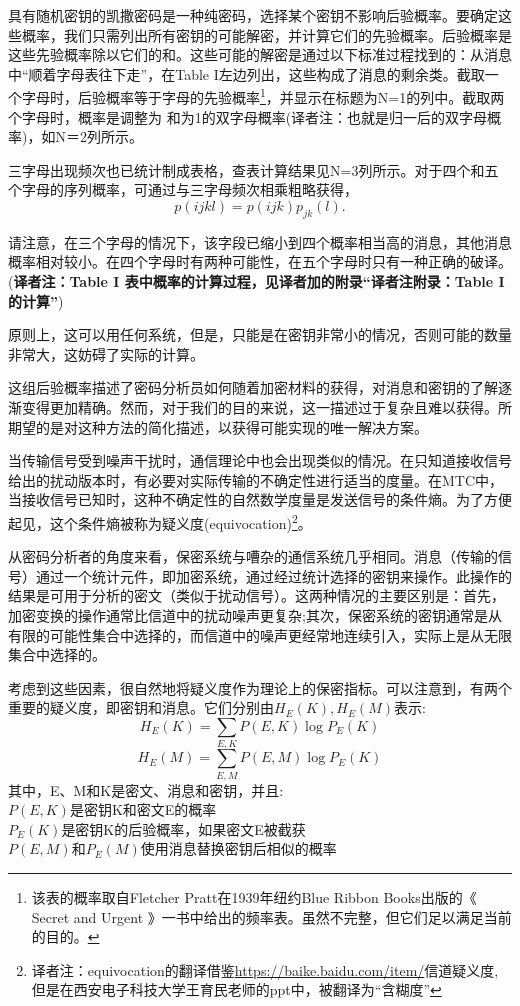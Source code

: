 \documentclass[]{article}
\begin{document}
具有随机密钥的凯撒密码是一种纯密码，选择某个密钥不影响后验概率。要确定这些概率，我们只需列出所有密钥的可能解密，并计算它们的先验概率。后验概率是这些先验概率除以它们的和。这些可能的解密是通过以下标准过程找到的：从消息中“顺着字母表往下走”，在Table I左边列出，这些构成了消息的剩余类。截取一个字母时，后验概率等于字母的先验概率\footnote{该表的概率取自Fletcher Pratt在1939年纽约Blue Ribbon Books出版的《 Secret and Urgent  》一书中给出的频率表。虽然不完整，但它们足以满足当前的目的。}，并显示在标题为N=1的列中。截取两个字母时，概率是调整为
和为1的双字母概率(译者注：也就是归一后的双字母概率)，如N＝2列所示。

三字母出现频次也已统计制成表格，查表计算结果见N=3列所示。对于四个和五个字母的序列概率，可通过与三字母频次相乘粗略获得，
\[p(ijkl)=p(ijk)p_{jk}(l).\]

请注意，在三个字母的情况下，该字段已缩小到四个概率相当高的消息，其他消息概率相对较小。在四个字母时有两种可能性，在五个字母时只有一种正确的破译。(\textbf{译者注：Table I 表中概率的计算过程，见译者加的附录“译者注附录：Table I的计算”})

原则上，这可以用任何系统，但是，只能是在密钥非常小的情况，否则可能的数量非常大，这妨碍了实际的计算。

这组后验概率描述了密码分析员如何随着加密材料的获得，对消息和密钥的了解逐渐变得更加精确。然而，对于我们的目的来说，这一描述过于复杂且难以获得。所期望的是对这种方法的简化描述，以获得可能实现的唯一解决方案。

当传输信号受到噪声干扰时，通信理论中也会出现类似的情况。在只知道接收信号给出的扰动版本时，有必要对实际传输的不确定性进行适当的度量。在MTC中，当接收信号已知时，这种不确定性的自然数学度量是发送信号的条件熵。为了方便起见，这个条件熵被称为疑义度(equivocation)\footnote{译者注：equivocation的翻译借鉴\url{https://baike.baidu.com/item/}信道疑义度,但是在西安电子科技大学王育民老师的ppt中，被翻译为“含糊度”}。

从密码分析者的角度来看，保密系统与嘈杂的通信系统几乎相同。消息（传输的信号）通过一个统计元件，即加密系统，通过经过统计选择的密钥来操作。此操作的结果是可用于分析的密文（类似于扰动信号）。这两种情况的主要区别是：首先，加密变换的操作通常比信道中的扰动噪声更复杂;其次，保密系统的密钥通常是从有限的可能性集合中选择的，而信道中的噪声更经常地连续引入，实际上是从无限集合中选择的。

考虑到这些因素，很自然地将疑义度作为理论上的保密指标。可以注意到，有两个重要的疑义度，即密钥和消息。它们分别由$H_E(K),H_E(M)$表示:
\[H_E(K)=\sum_{E,K}{P(E,K)\log{P_E(K)}}\]
\[H_E(M)=\sum_{E,M}{P(E,M)\log{P_E(K)}}\]
其中，E、M和K是密文、消息和密钥，并且:\\
$P(E,K)$是密钥K和密文E的概率\\
$P_E(K)$是密钥K的后验概率，如果密文E被截获\\
$P(E,M)$和$P_E(M)$使用消息替换密钥后相似的概率\\
\end{document}
